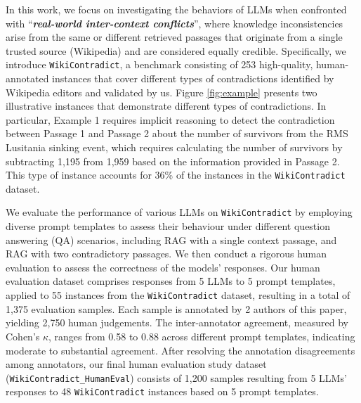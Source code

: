 In this work, we focus on investigating the behaviors of LLMs when confronted with ``\textbf{\emph{real-world inter-context conflicts}}'', where knowledge inconsistencies arise from the same or different retrieved passages that originate from a single trusted source (Wikipedia) and are considered equally credible. Specifically, we introduce \texttt{WikiContradict}, a benchmark consisting of 253 high-quality, human-annotated instances that cover different types of contradictions identified by Wikipedia editors and validated by us.
Figure \ref{fig:example} presents two illustrative instances that demonstrate different types of contradictions. In particular, Example 1 requires implicit reasoning to detect the contradiction between Passage 1 and Passage 2 about the number of survivors from the RMS Lusitania sinking event, which requires calculating the number of survivors by subtracting 1,195 from 1,959 based on the information provided in Passage 2. This type of instance accounts for 36\% of the instances in the \texttt{WikiContradict} dataset.

We evaluate the performance of various LLMs on \texttt{WikiContradict} by employing diverse prompt templates to assess their behaviour under different question answering (QA) scenarios, including RAG with a single context passage, and RAG with two contradictory passages. We then conduct a rigorous human evaluation to assess the correctness of the models' responses. Our human evaluation dataset comprises responses from 5 LLMs to 5 prompt templates, applied to 55 instances from the \texttt{WikiContradict} dataset, resulting in a total of 1,375 evaluation samples. Each sample is annotated by 2 authors of this paper, yielding 2,750 human judgements. The inter-annotator agreement, measured by Cohen's $\kappa$, ranges from 0.58 to 0.88 across different prompt templates, indicating moderate to substantial agreement.
After resolving the annotation disagreements among annotators, our final human evaluation study dataset (\texttt{WikiContradict\_HumanEval}) consists of 1,200 samples resulting from 5 
LLMs' responses to 48 \texttt{WikiContradict} instances based on 5 prompt templates. 

